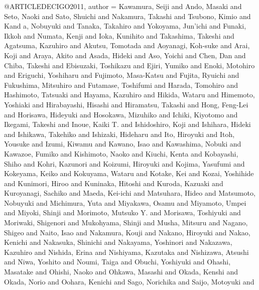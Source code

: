 \documentclass[twocolumn,tighten]{aastex63}
\begin{document}
@ARTICLE{DECIGO2011,
       author = {{Kawamura}, Seiji and {Ando}, Masaki and {Seto}, Naoki and
         {Sato}, Shuichi and {Nakamura}, Takashi and {Tsubono}, Kimio and {Kand
        a}, Nobuyuki and {Tanaka}, Takahiro and {Yokoyama}, Jun'ichi and
         {Funaki}, Ikkoh and {Numata}, Kenji and {Ioka}, Kunihito and
         {Takashima}, Takeshi and {Agatsuma}, Kazuhiro and {Akutsu}, Tomotada and
         {Aoyanagi}, Koh-suke and {Arai}, Koji and {Araya}, Akito and
         {Asada}, Hideki and {Aso}, Yoichi and {Chen}, Dan and {Chiba}, Takeshi and
         {Ebisuzaki}, Toshikazu and {Ejiri}, Yumiko and {Enoki}, Motohiro and
         {Eriguchi}, Yoshiharu and {Fujimoto}, Masa-Katsu and {Fujita}, Ryuichi and
         {Fukushima}, Mitsuhiro and {Futamase}, Toshifumi and
         {Harada}, Tomohiro and {Hashimoto}, Tatsuaki and {Hayama}, Kazuhiro and
         {Hikida}, Wataru and {Himemoto}, Yoshiaki and {Hirabayashi}, Hisashi and
         {Hiramatsu}, Takashi and {Hong}, Feng-Lei and {Horisawa}, Hideyuki and
         {Hosokawa}, Mizuhiko and {Ichiki}, Kiyotomo and {Ikegami}, Takeshi and
         {Inoue}, Kaiki T. and {Ishidoshiro}, Koji and {Ishihara}, Hideki and
         {Ishikawa}, Takehiko and {Ishizaki}, Hideharu and {Ito}, Hiroyuki and
         {Itoh}, Yousuke and {Izumi}, Kiwamu and {Kawano}, Isao and
         {Kawashima}, Nobuki and {Kawazoe}, Fumiko and {Kishimoto}, Naoko and
         {Kiuchi}, Kenta and {Kobayashi}, Shiho and {Kohri}, Kazunori and
         {Koizumi}, Hiroyuki and {Kojima}, Yasufumi and {Kokeyama}, Keiko and
         {Kokuyama}, Wataru and {Kotake}, Kei and {Kozai}, Yoshihide and
         {Kunimori}, Hiroo and {Kuninaka}, Hitoshi and {Kuroda}, Kazuaki and
         {Kuroyanagi}, Sachiko and {Maeda}, Kei-ichi and {Matsuhara}, Hideo and
         {Matsumoto}, Nobuyuki and {Michimura}, Yuta and {Miyakawa}, Osamu and
         {Miyamoto}, Umpei and {Miyoki}, Shinji and {Morimoto}, Mutsuko Y. and
         {Morisawa}, Toshiyuki and {Moriwaki}, Shigenori and
         {Mukohyama}, Shinji and {Musha}, Mitsuru and {Nagano}, Shigeo and
         {Naito}, Isao and {Nakamura}, Kouji and {Nakano}, Hiroyuki and
         {Nakao}, Kenichi and {Nakasuka}, Shinichi and {Nakayama}, Yoshinori and
         {Nakazawa}, Kazuhiro and {Nishida}, Erina and {Nishiyama}, Kazutaka and
         {Nishizawa}, Atsushi and {Niwa}, Yoshito and {Noumi}, Taiga and
         {Obuchi}, Yoshiyuki and {Ohashi}, Masatake and {Ohishi}, Naoko and
         {Ohkawa}, Masashi and {Okada}, Kenshi and {Okada}, Norio and
         {Oohara}, Kenichi and {Sago}, Norichika and {Saijo}, Motoyuki and
}}
\end{document}
